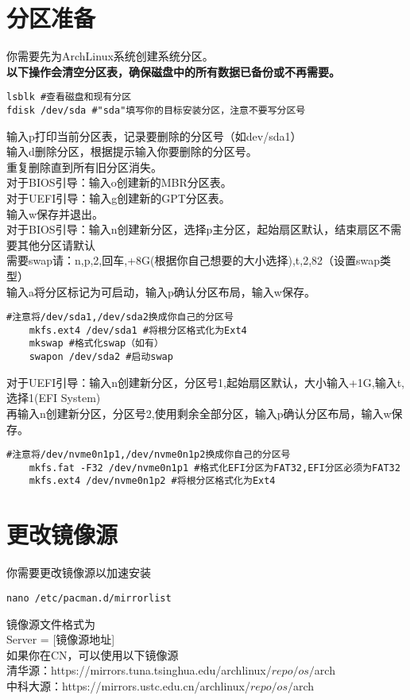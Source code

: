 \documentclass[a4paper,12pt]{article}
\begin{document}
\section{分区准备}
你需要先为ArchLinux系统创建系统分区。\\
\textbf{以下操作会清空分区表，确保磁盘中的所有数据已备份或不再需要。}\\
\begin{lstlisting}[language=Shell]
lsblk #查看磁盘和现有分区
fdisk /dev/sda #"sda"填写你的目标安装分区，注意不要写分区号
\end{lstlisting}
输入p打印当前分区表，记录要删除的分区号（如dev/sda1）\\
输入d删除分区，根据提示输入你要删除的分区号。\\
重复删除直到所有旧分区消失。\\
对于BIOS引导：输入o创建新的MBR分区表。\\
对于UEFI引导：输入g创建新的GPT分区表。\\
输入w保存并退出。\\
对于BIOS引导：输入n创建新分区，选择p主分区，起始扇区默认，结束扇区不需要其他分区请默认\\
需要swap请：n,p,2,回车,+8G(根据你自己想要的大小选择),t,2,82（设置swap类型）\\
输入a将分区标记为可启动，输入p确认分区布局，输入w保存。\\
\begin{lstlisting}[language=Shell]
	#注意将/dev/sda1,/dev/sda2换成你自己的分区号
	mkfs.ext4 /dev/sda1 #将根分区格式化为Ext4
	mkswap #格式化swap（如有）
	swapon /dev/sda2 #启动swap
\end{lstlisting}
对于UEFI引导：输入n创建新分区，分区号1,起始扇区默认，大小输入+1G,输入t,选择1(EFI System)\\
再输入n创建新分区，分区号2,使用剩余全部分区，输入p确认分区布局，输入w保存。\\
\begin{lstlisting}[language=Shell]
	#注意将/dev/nvme0n1p1,/dev/nvme0n1p2换成你自己的分区号
	mkfs.fat -F32 /dev/nvme0n1p1 #格式化EFI分区为FAT32,EFI分区必须为FAT32
	mkfs.ext4 /dev/nvme0n1p2 #将根分区格式化为Ext4
\end{lstlisting}

\section{更改镜像源}
你需要更改镜像源以加速安装\\
\begin{lstlisting}[language=Shell]
	nano /etc/pacman.d/mirrorlist
\end{lstlisting}
镜像源文件格式为\\
Server = [镜像源地址]\\
如果你在CN，可以使用以下镜像源\\
清华源：https://mirrors.tuna.tsinghua.edu/archlinux/$repo/os/$arch\\
中科大源：https://mirrors.ustc.edu.cn/archlinux/$repo/os/$arch\\
\end{document}
